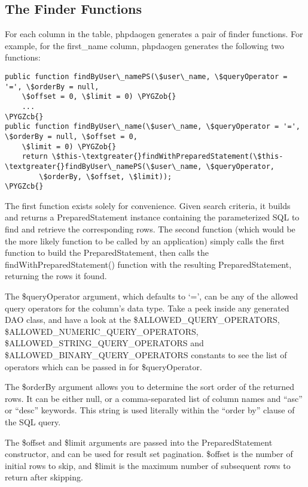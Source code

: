 \documentclass[letterpaper,10pt,english]{sphinxmanual}
\def\PYGZob{\char`\{}
\def\PYGZcb{\char`\}}
\begin{document}
\subsection{The Finder Functions}
\label{jaxFrameworkGuide:the-finder-functions}
For each column in the table, phpdaogen generates a pair of finder functions.  For example, for the
first\_name column, phpdaogen generates the following two functions:

\begin{Verbatim}[commandchars=\\\{\}]
public function findByUser\_namePS(\$user\_name, \$queryOperator = '=', \$orderBy = null,
    \$offset = 0, \$limit = 0) \PYGZob{}
    ...
\PYGZcb{}
public function findByUser\_name(\$user\_name, \$queryOperator = '=', \$orderBy = null, \$offset = 0,
    \$limit = 0) \PYGZob{}
    return \$this-\textgreater{}findWithPreparedStatement(\$this-\textgreater{}findByUser\_namePS(\$user\_name, \$queryOperator,
        \$orderBy, \$offset, \$limit));
\PYGZcb{}
\end{Verbatim}

The first function exists solely for convenience.  Given search criteria, it builds and returns a
PreparedStatement instance containing the parameterized SQL to find and retrieve the corresponding
rows.  The second function (which would be the more likely function to be called by an application)
simply calls the first function to build the PreparedStatement, then calls the
findWithPreparedStatement() function with the resulting PreparedStatement, returning the rows it
found.

The \$queryOperator argument, which defaults to `=', can be any of the allowed query operators for
the column's data type.  Take a peek inside any generated DAO class, and have a look at the
\$ALLOWED\_QUERY\_OPERATORS, \$ALLOWED\_NUMERIC\_QUERY\_OPERATORS, \$ALLOWED\_STRING\_QUERY\_OPERATORS and
\$ALLOWED\_BINARY\_QUERY\_OPERATORS constants to see the list of operators which can be passed in for
\$queryOperator.

The \$orderBy argument allows you to determine the sort order of the returned rows.  It can be either
null, or a comma-separated list of column names and ``asc'' or ``desc'' keywords.  This string is used
literally within the ``order by'' clause of the SQL query.

The \$offset and \$limit arguments are passed into the PreparedStatement constructor, and can be used
for result set pagination.  \$offset is the number of initial rows to skip, and \$limit is the maximum
number of subsequent rows to return after skipping.
\end{document}
